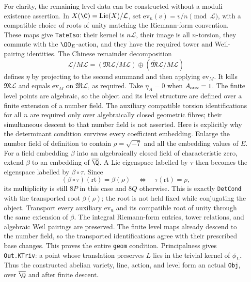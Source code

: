 For clarity, the remaining level data can be constructed
without a moduli existence assertion.  In
$X(\C)=\operatorname{Lie}(X)/\mathcal L$, set
$\mathrm{ev}_n(v)=v/n\pmod{\mathcal L}$, with a compatible
choice of roots of unity matching the Riemann-form convention.
These maps give \texttt{TateIso}: their kernel is
$n\mathcal L$, their image is all $n$-torsion, they commute
with the $\OO_E$-action, and they have the required tower and
Weil-pairing identities.  The Chinese remainder decomposition
\[
 \mathcal L/M\mathcal L
       =(\mathfrak M\mathcal L/M\mathcal L)
        \oplus(\overline{\mathfrak M}\mathcal L/M\mathcal L)
\]
defines $\eta$ by projecting to the second summand and then
applying $\mathrm{ev}_M$.  It kills
$\mathfrak M\mathcal L$ and equals $\mathrm{ev}_M$ on
$\overline{\mathfrak M}\mathcal L$, as required.  Take
$\eta_A=0$ when $A_{\rm aux}=1$.  The finite level points are
algebraic, so the object and its level structure are defined
over a finite extension of a number field.  The auxiliary
compatible torsion identifications for all $n$ are required
only over algebraically closed geometric fibres; their
simultaneous descent to that number field is not asserted.
Here is explicitly why the determinant condition survives
every coefficient embedding.  Enlarge the number field of
definition to contain $\rho=\sqrt{-7}$ and all the embedding
values of $E$.  For a field embedding $\beta$ into an
algebraically closed field of characteristic zero, extend
$\beta$ to an embedding of $\overline\Q$.  A Lie eigenspace
labelled by $\tau$ then becomes the eigenspace labelled by
$\beta\circ\tau$.  Since
\[
 (\beta\circ\tau)(\mathrm{rt})=\beta(\rho)
                  \quad\Longleftrightarrow\quad
                  \tau(\mathrm{rt})=\rho,
\]
its multiplicity is still $8P$ in this case and $8Q$
otherwise.  This is exactly \texttt{DetCond} with the
transported root $\beta(\rho)$; the root is not held fixed
while conjugating the object.  Transport every auxiliary
$\mathrm{ev}_n$ and its compatible root of unity through
the same extension of $\beta$.  The integral Riemann-form
entries, tower relations, and algebraic Weil pairings are
preserved.  The finite level maps already descend to the
number field, so the transported identifications agree with
their prescribed base changes.  This proves the entire
\texttt{geom} condition.  Principalness gives
\texttt{Out.KTriv}: a point whose translation preserves $L$
lies in the trivial kernel of $\phi_L$.  Thus the constructed
abelian variety, line, action, and level form an actual
\texttt{Obj}, over $\overline\Q$ and after finite descent.

